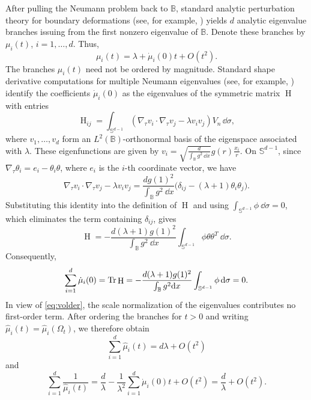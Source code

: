 \documentclass{amsart}
\numberwithin{equation}{section}
\theoremstyle{plain}
\theoremstyle{definition}
\theoremstyle{plain}
\theoremstyle{remark}
\numberwithin{figure}{section}
\DeclareMathOperator{\hh}{H}
\newcommand{\B}{\mathbb{B}}
\newcommand{\ints}{\int_{\mathbb{S}^{d-1}}}
\newcommand{\muu}{\widehat{\mu}}
\begin{document}
After pulling the Neumann problem back to $\B$, standard analytic perturbation theory for boundary deformations (see, for example, \cite[Chapter VII, \S6.5]{Kat76}) yields $d$ analytic eigenvalue branches issuing from the first nonzero eigenvalue of $\B$. Denote these branches by $\mu_i(t)$, $i=1,\dots,d$. Thus,
\begin{equation}
    \label{eq:muit}
    \mu_i(t)=\lambda+\dot{\mu}_i(0)t+O(t^2).
\end{equation}
The branches $\mu_i(t)$ need not be ordered by magnitude. Standard shape derivative computations for multiple Neumann eigenvalues (see, for example, \cite[Proposition 2]{ZHL20}) identify the coefficients $\dot{\mu}_i(0)$ as the eigenvalues of the symmetric matrix $\hh$ with entries 
\[
    \hh_{ij} =  \ints (\nabla_\tau v_i\cdot\nabla_{\tau}v_j-\lambda v_iv_j)V_n \,\dd\sigma,
\]
where $v_1,\dots,v_d$ form an $L^2(\B)$-orthonormal basis of the eigenspace associated with $\lambda$. These eigenfunctions are given by $v_i=\sqrt{\frac{d}{\int_{\B}g^2~\dd x}}g(r)\frac{x_i}{r}$. On $\mathbb{S}^{d-1}$, since $\nabla_\tau\theta_i=e_i-\theta_i\theta$, where $e_i$ is the $i$-th coordinate vector, we have
\[
    \nabla_\tau v_i\cdot\nabla_\tau v_j-\lambda v_iv_j=\frac{dg(1)^2}{\int_{\B}g^2~\dd x}\big(\delta_{ij}-(\lambda+1)\theta_i\theta_j\big).
\]
Substituting this identity into the definition of $\hh$ and using $\ints\phi~\dd\sigma=0$, which eliminates the term containing $\delta_{ij}$, gives
\begin{equation}
    \label{eq:H1}
    \hh=-\frac{d(\lambda+1)g(1)^2}{\int_{\B}g^2~\dd x}\ints\phi\theta\theta^T~\dd\sigma.
\end{equation}
Consequently,
\[
    \sum_{i=1}^d \dot{\mu}_i(0) = \Tr\hh=-\frac{d(\lambda+1)g(1)^2}{\int_{\B}g^2\dd x}\ints \phi \,\dd\sigma = 0. 
\]
In view of \cref{eq:volder}, the scale normalization of the eigenvalues contributes no first-order term. After ordering the branches for $t>0$ and writing $\muu_i(t)=\muu_i(\Omega_t)$, we therefore obtain
\[
    \sum_{i=1}^d \muu_i(t) = d\lambda + O(t^2) 
\]
and
\[
    \sum_{i=1}^d \frac{1}{\muu_i(t)} = \frac{d}{\lambda} - \frac{1}{\lambda^2}\sum_{i=1}^d \dot{\mu}_i(0) t +O(t^2) = \frac{d}{\lambda} + O(t^2).
\]
\end{document}
